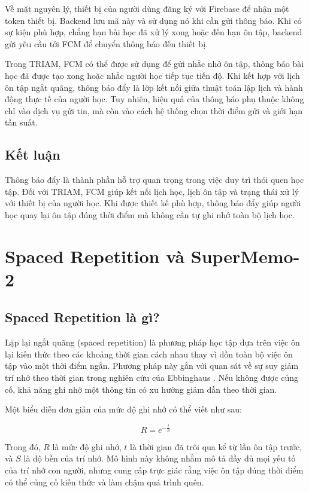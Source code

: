 \documentclass[12pt,a4paper]{report}
\begin{document}
Về mặt nguyên lý, thiết bị của người dùng đăng ký với Firebase để nhận một token thiết bị. Backend lưu mã này và sử dụng nó khi cần gửi thông báo. Khi có sự kiện phù hợp, chẳng hạn bài học đã xử lý xong hoặc đến hạn ôn tập, backend gửi yêu cầu tới FCM để chuyển thông báo đến thiết bị.

Trong TRIAM, FCM có thể được sử dụng để gửi nhắc nhở ôn tập, thông báo bài học đã được tạo xong hoặc nhắc người học tiếp tục tiến độ. Khi kết hợp với lịch ôn tập ngắt quãng, thông báo đẩy là lớp kết nối giữa thuật toán lập lịch và hành động thực tế của người học. Tuy nhiên, hiệu quả của thông báo phụ thuộc không chỉ vào dịch vụ gửi tin, mà còn vào cách hệ thống chọn thời điểm gửi và giới hạn tần suất.

\subsection{Kết luận}

Thông báo đẩy là thành phần hỗ trợ quan trọng trong việc duy trì thói quen học tập. Đối với TRIAM, FCM giúp kết nối lịch học, lịch ôn tập và trạng thái xử lý với thiết bị của người học. Khi được thiết kế phù hợp, thông báo đẩy giúp người học quay lại ôn tập đúng thời điểm mà không cần tự ghi nhớ toàn bộ lịch học.

\section{Spaced Repetition và SuperMemo-2}

\subsection{Spaced Repetition là gì?}

Lặp lại ngắt quãng (spaced repetition) là phương pháp học tập dựa trên việc ôn lại kiến thức theo các khoảng thời gian cách nhau thay vì dồn toàn bộ việc ôn tập vào một thời điểm ngắn. Phương pháp này gắn với quan sát về sự suy giảm trí nhớ theo thời gian trong nghiên cứu của Ebbinghaus \cite{ebbinghaus1913memory}. Nếu không được củng cố, khả năng ghi nhớ một thông tin có xu hướng giảm dần theo thời gian.

Một biểu diễn đơn giản của mức độ ghi nhớ có thể viết như sau:

\[
R = e^{-\frac{t}{S}}
\]

Trong đó, \(R\) là mức độ ghi nhớ, \(t\) là thời gian đã trôi qua kể từ lần ôn tập trước, và \(S\) là độ bền của trí nhớ. Mô hình này không nhằm mô tả đầy đủ mọi yếu tố của trí nhớ con người, nhưng cung cấp trực giác rằng việc ôn tập đúng thời điểm có thể củng cố kiến thức và làm chậm quá trình quên.
\end{document}
